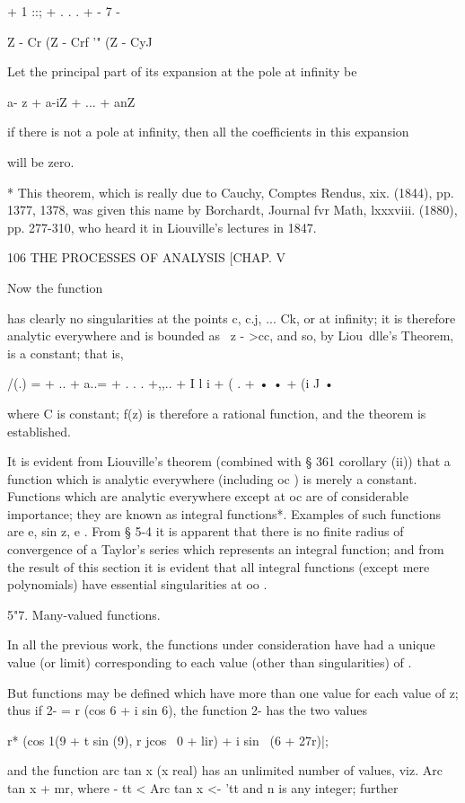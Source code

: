 {{{{+ 1 ::; + . . . + - 7 -

Z - Cr (Z - Crf '" (Z - CyJ

Let the principal part of its expansion at the pole at infinity be

a- z + a-iZ + ... + anZ \

if there is not a pole at infinity, then all the coefficients in this
expansion

will be zero.

* This theorem, which is really due to Cauchy, Comptes Rendus, xix.
(1844), pp. 1377, 1378, was given this name by Borchardt, Journal fvr
Math, lxxxviii. (1880), pp. 277-310, who heard it in Liouville's
lectures in 1847.

106 THE PROCESSES OF ANALYSIS [CHAP. V

Now the function

has clearly no singularities at the points c, c.j, ... Ck, or at
infinity; it is therefore analytic everywhere and is bounded as \ z -
>cc, and so, by Liou\ dlle's Theorem, is a constant; that is,

/(.) = + .. + a..= + . . . +,,.. + I l i + ( . + • • + (i J •

where C is constant; f(z) is therefore a rational function, and the
theorem is established.

It is evident from Liouville's theorem (combined with § 361 corollary
(ii)) that a function which is analytic everywhere (including oc ) is
merely a constant. Functions which are analytic everywhere except at
oc are of considerable importance; they are known as integral
functions*. Examples of such functions are e, sin z, e . From § 5-4
it is apparent that there is no finite radius of convergence of a
Taylor's series which represents an integral function; and from the
result of this section it is evident that all integral functions
(except mere polynomials) have essential singularities at oo .

5"7. Many-valued functions.

In all the previous work, the functions under consideration have had a
unique value (or limit) corresponding to each value (other than
singularities) of .

But functions may be defined which have more than one value for each
value of z; thus if 2- = r (cos 6 + i sin 6), the function 2- has the
two values

r* (cos 1(9 + t sin (9), r jcos \ 0 + lir) + i sin \ (6 + 27r)|;

and the function arc tan x (x real) has an unlimited number of values,
viz. Arc tan x + mr, where - tt < Arc tan x <- 'tt and n is any
integer; further

}}}}
